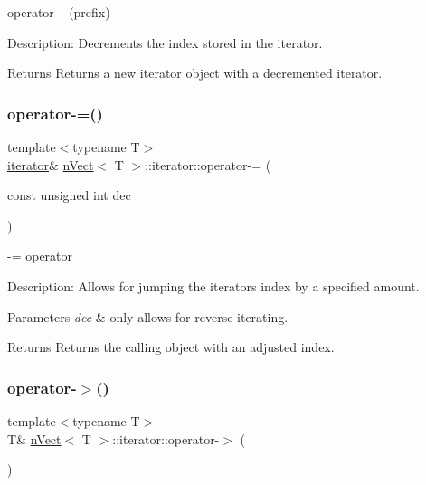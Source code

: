 operator -- (prefix) 

Description\+: Decrements the index stored in the iterator. \begin{DoxyReturn}{Returns}
Returns a new iterator object with a decremented iterator. 
\end{DoxyReturn}
\mbox{\label{classnVect_1_1iterator_a1dc00f521ea60257023cd95a1e9238dd}} 
\subsubsection{\texorpdfstring{operator-\/=()}{operator-=()}}
{\footnotesize\ttfamily template$<$typename T$>$ \\
\hyperlink{classnVect_1_1iterator}{iterator}\& \hyperlink{classnVect}{n\+Vect}$<$ T $>$\+::iterator\+::operator-\/= (\begin{DoxyParamCaption}\item[{const unsigned int}]{dec }\end{DoxyParamCaption})\hspace{0.3cm}{\ttfamily [inline]}}



-\/= operator 

Description\+: Allows for jumping the iterator\textquotesingle{}s index by a specified amount. 
\begin{DoxyParams}{Parameters}
{\em dec} & only allows for reverse iterating. \\
\hline
\end{DoxyParams}
\begin{DoxyReturn}{Returns}
Returns the calling object with an adjusted index. 
\end{DoxyReturn}
\mbox{\label{classnVect_1_1iterator_a58333e36f3e8bc4519b41667dbf4a710}} 
\subsubsection{\texorpdfstring{operator-\/$>$()}{operator->()}}
{\footnotesize\ttfamily template$<$typename T$>$ \\
T\& \hyperlink{classnVect}{n\+Vect}$<$ T $>$\+::iterator\+::operator-\/$>$ (\begin{DoxyParamCaption}{ }\end{DoxyParamCaption})\hspace{0.3cm}{\ttfamily [inline]}}




